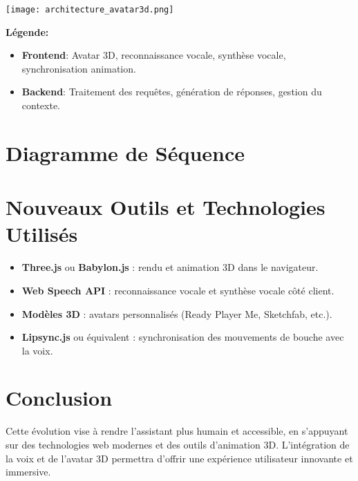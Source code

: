 \documentclass[a4paper,12pt]{article}
\begin{document}
\begin{center}
\texttt{[image: architecture\_avatar3d.png]}
\end{center}

\textbf{Légende:}
\begin{itemize}
    \item \textbf{Frontend}: Avatar 3D, reconnaissance vocale, synthèse vocale, synchronisation animation.
    \item \textbf{Backend}: Traitement des requêtes, génération de réponses, gestion du contexte.
\end{itemize}

\section{Diagramme de Séquence}

\begin{center}
\end{center}

\section{Nouveaux Outils et Technologies Utilisés}
\begin{itemize}
    \item \textbf{Three.js} ou \textbf{Babylon.js} : rendu et animation 3D dans le navigateur.
    \item \textbf{Web Speech API} : reconnaissance vocale et synthèse vocale côté client.
    \item \textbf{Modèles 3D} : avatars personnalisés (Ready Player Me, Sketchfab, etc.).
    \item \textbf{Lipsync.js} ou équivalent : synchronisation des mouvements de bouche avec la voix.
\end{itemize}

\section{Conclusion}
Cette évolution vise à rendre l’assistant plus humain et accessible, en s’appuyant sur des technologies web modernes et des outils d’animation 3D. L’intégration de la voix et de l’avatar 3D permettra d’offrir une expérience utilisateur innovante et immersive.
\end{document}
